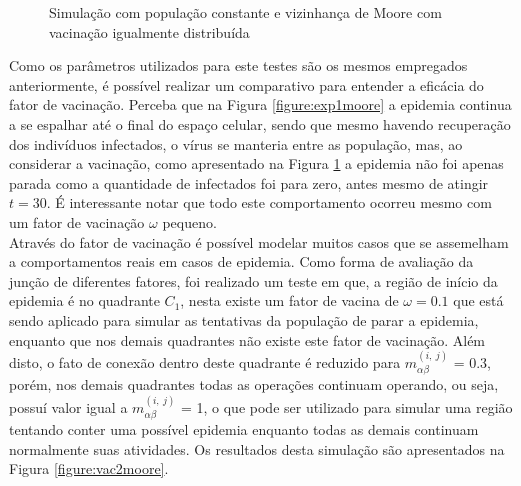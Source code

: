 \documentclass[a4paper,12pt]{article}
\begin{document}
\begin{figure}[!ht]
\qquad
{}
\qquad
{}
\caption{Simulação com população constante e vizinhança de Moore com vacinação igualmente distribuída}
\label{figure:vac1moore}
\end{figure}

\newpage
Como os parâmetros utilizados para este testes são os mesmos empregados anteriormente, é possível realizar um comparativo para entender a eficácia do fator de vacinação. Perceba que na Figura \ref{figure:exp1moore} a epidemia continua a se espalhar até o final do espaço celular, sendo que mesmo havendo recuperação dos indivíduos infectados, o vírus se manteria entre as população, mas, ao considerar a vacinação, como apresentado na Figura \ref{figure:vac1moore} a epidemia não foi apenas parada como a quantidade de infectados foi para zero, antes mesmo de atingir $t = 30$. É interessante notar que todo este comportamento ocorreu mesmo com um fator de vacinação $\omega$ pequeno. \\

Através do fator de vacinação é possível modelar muitos casos que se assemelham a comportamentos reais em casos de epidemia. Como forma de avaliação da junção de diferentes fatores, foi realizado um teste em que, a região de início da epidemia é no quadrante $C_1$, nesta existe um fator de vacina de $\omega = 0.1$ que está sendo aplicado para simular as tentativas da população de parar a epidemia, enquanto que nos demais quadrantes não existe este fator de vacinação. Além disto, o fato de conexão dentro deste quadrante é reduzido para $ m_{\alpha \beta}^{\left(i,\:j\right)}$ = 0.3, porém, nos demais quadrantes todas as operações continuam operando, ou seja, possuí valor igual a $ m_{\alpha \beta}^{\left(i,\:j\right)}$ = 1, o que pode ser utilizado para simular uma região tentando conter uma possível epidemia enquanto todas as demais continuam normalmente suas atividades. Os resultados desta simulação são apresentados na Figura \ref{figure:vac2moore}. 
\end{document}
